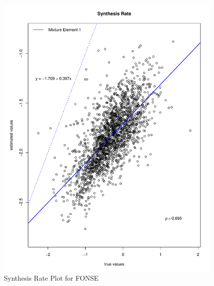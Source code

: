 \documentclass[11pt]{labbook}
\begin{document}
    \begin{figure}
        \centering
        \includegraphics[scale=.65]{FONSE_Plots/2016/July_28/SynthesisRateComp}
        \caption{Synthesis Rate Plot for FONSE}
        \label{fig:JULY28_SYNTH}
    \end{figure}
\end{document}
